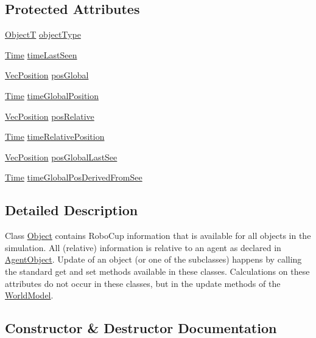 \subsection*{Protected Attributes}
\begin{DoxyCompactItemize}
\item 
\hyperlink{SoccerTypes_8h_ad4b701fa66e7d26c054ed15b7820c77c}{ObjectT} \hyperlink{classObject_a1ecdca38441a375acbd102de3060b972}{object\+Type}
\item 
\hyperlink{classTime}{Time} \hyperlink{classObject_ac119901c38bac85c71027606f36cd38d}{time\+Last\+Seen}
\item 
\hyperlink{classVecPosition}{Vec\+Position} \hyperlink{classObject_a7b1e09877ae916b49f64b9a9e9a3e0d1}{pos\+Global}
\item 
\hyperlink{classTime}{Time} \hyperlink{classObject_a8892e8727938cdde9c00348848e39b53}{time\+Global\+Position}
\item 
\hyperlink{classVecPosition}{Vec\+Position} \hyperlink{classObject_afc3fa9f935ff0e47ea8057f742ea623c}{pos\+Relative}
\item 
\hyperlink{classTime}{Time} \hyperlink{classObject_a0efe361db316649d7d40132b76ed8d41}{time\+Relative\+Position}
\item 
\hyperlink{classVecPosition}{Vec\+Position} \hyperlink{classObject_a49148cd616efbb888175bfa825dcd167}{pos\+Global\+Last\+See}
\item 
\hyperlink{classTime}{Time} \hyperlink{classObject_a2f113089a45a792db77b03e16b8152a1}{time\+Global\+Pos\+Derived\+From\+See}
\end{DoxyCompactItemize}


\subsection{Detailed Description}
Class \hyperlink{classObject}{Object} contains Robo\+Cup information that is available for all objects in the simulation. All (relative) information is relative to an agent as declared in \hyperlink{classAgentObject}{Agent\+Object}. Update of an object (or one of the subclasses) happens by calling the standard get and set methods available in these classes. Calculations on these attributes do not occur in these classes, but in the update methods of the \hyperlink{classWorldModel}{World\+Model}. 

\subsection{Constructor \& Destructor Documentation}
